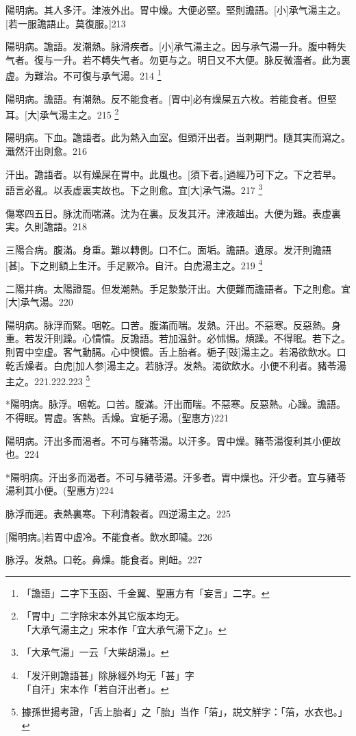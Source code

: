 \documentclass[12pt,oneside,UTF8,b5paper]{ctexbook}她她她她她她她
\begin{document}
陽明病。其人多汗。津液外出。胃中燥。大便必堅。堅則譫語。[小]承气湯主之。[若一服譫語止。莫復服。]213

陽明病。譫語。发潮熱。脉滑疾者。[小]承气湯主之。因与承气湯一升。腹中轉失气者。復与一升。若不轉失气者。勿更与之。明日又不大便。脉反微濇者。此为裏虚。为難治。不可復与承气湯。214
	\footnote{「譫語」二字下玉函、千金翼、聖惠方有「妄言」二字。}

陽明病。譫語。有潮熱。反不能食者。[胃中]必有燥屎五六枚。若能食者。但堅耳。[大]承气湯主之。215
	\footnote{「胃中」二字除宋本外其它版本均无。\\「大承气湯主之」宋本作「宜大承气湯下之」。}

陽明病。下血。譫語者。此为熱入血室。但頭汗出者。当刺期門。隨其実而瀉之。濈然汗出則愈。216

汗出。譫語者。以有燥屎在胃中。此風也。[須下者。]過經乃可下之。下之若早。語言必亂。以表虚裏実故也。下之則愈。宜[大]承气湯。217
	\footnote{「大承气湯」一云「大柴胡湯」。}

傷寒四五日。脉沈而喘滿。沈为在裏。反发其汗。津液越出。大便为難。表虚裏実。久則譫語。218

三陽合病。腹滿。身重。難以轉側。口不仁。面垢。譫語。遺尿。发汗則譫語[甚]。下之則額上生汗。手足厥冷。自汗。白虎湯主之。219
	\footnote{「发汗則譫語甚」除脉經外均无「甚」字\\「自汗」宋本作「若自汗出者」。}

二陽并病。太陽證罷。但发潮熱。手足漐漐汗出。大便難而譫語者。下之則愈。宜[大]承气湯。220

陽明病。脉浮而緊。咽乾。口苦。腹滿而喘。发熱。汗出。不惡寒。反惡熱。身重。若发汗則躁。心憒憒。反譫語。若加温針。必怵惕。煩躁。不得眠。若下之。則胃中空虚。客气動膈。心中懊憹。舌上胎者。梔子[豉]湯主之。若渴欲飲水。口乾舌燥者。白虎[加人参]湯主之。若脉浮。发熱。渴欲飲水。小便不利者。豬苓湯主之。221.222.223
	\footnote{據孫世揚考證，「舌上胎者」之「胎」当作「菭」，説文觧字：「菭，水衣也。」}

*陽明病。脉浮。咽乾。口苦。腹滿。汗出而喘。不惡寒。反惡熱。心躁。譫語。不得眠。胃虚。客熱。舌燥。宜梔子湯。(聖惠方)221

陽明病。汗出多而渴者。不可与豬苓湯。以汗多。胃中燥。豬苓湯復利其小便故也。224

*陽明病。汗出多而渴者。不可与豬苓湯。汗多者。胃中燥也。汗少者。宜与豬苓湯利其小便。(聖惠方)224

脉浮而遲。表熱裏寒。下利清穀者。四逆湯主之。225

[陽明病。]若胃中虚冷。不能食者。飲水即噦。226

脉浮。发熱。口乾。鼻燥。能食者。則衄。227
\end{document}
